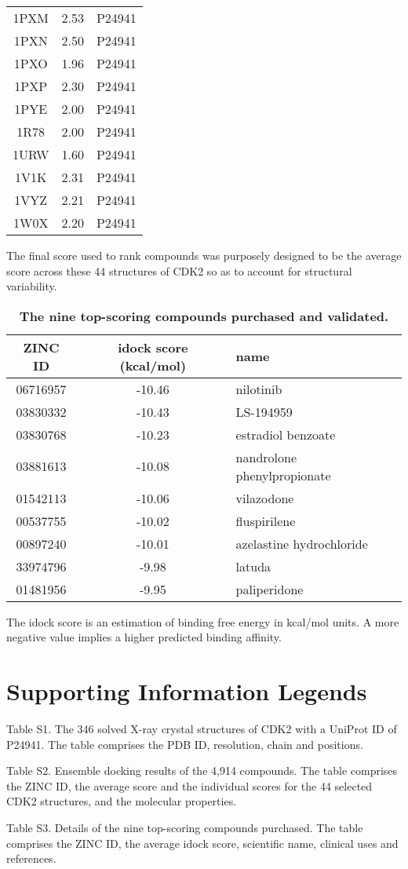 \documentclass[10pt]{article}
\begin{document}
\begin{table}
\begin{tabular}{ccc}
1PXM & 2.53 & P24941\\
1PXN & 2.50 & P24941\\
1PXO & 1.96 & P24941\\
1PXP & 2.30 & P24941\\
1PYE & 2.00 & P24941\\
1R78 & 2.00 & P24941\\
1URW & 1.60 & P24941\\
1V1K & 2.31 & P24941\\
1VYZ & 2.21 & P24941\\
1W0X & 2.20 & P24941\\
\hline
\end{tabular}
\begin{flushleft}\label{PDBs} The final score used to rank compounds was purposely designed to be the average score across these 44 structures of CDK2 so as to account for structural variability.
\end{flushleft}
\end{table}

\begin{table}
\caption{
\bf{The nine top-scoring compounds purchased and validated.}}
\begin{tabular}{ccl}
\hline
ZINC ID & idock score (kcal/mol) & name\\
\hline
06716957 & -10.46 & nilotinib\\
03830332 & -10.43 & LS-194959\\
03830768 & -10.23 & estradiol benzoate\\
03881613 & -10.08 & nandrolone phenylpropionate\\
01542113 & -10.06 & vilazodone\\
00537755 & -10.02 & fluspirilene\\
00897240 & -10.01 & azelastine hydrochloride\\
33974796 &  -9.98 & latuda\\
01481956 &  -9.95 & paliperidone\\
\hline
\end{tabular}
\begin{flushleft}\label{Top9} The idock score is an estimation of binding free energy in kcal/mol units. A more negative value implies a higher predicted binding affinity.
\end{flushleft}
\end{table}

\section*{Supporting Information Legends}

Table S1. The 346 solved X-ray crystal structures of CDK2 with a UniProt ID of P24941. The table comprises the PDB ID, resolution, chain and positions.%

Table S2. Ensemble docking results of the 4,914 compounds. The table comprises the ZINC ID, the average score and the individual scores for the 44 selected CDK2 structures, and the molecular properties.%

Table S3. Details of the nine top-scoring compounds purchased. The table comprises the ZINC ID, the average idock score, scientific name, clinical uses and references.%
\end{document}
